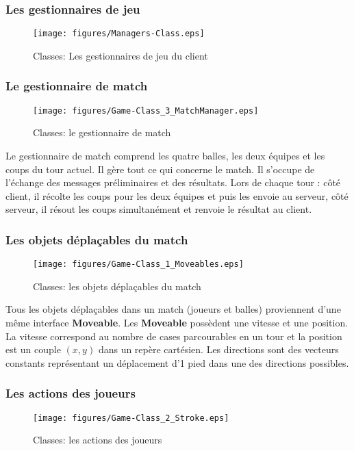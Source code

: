 \subsubsection{Les gestionnaires de jeu}
\begin{figure}[h!]
  \centering
  \texttt{[image: figures/Managers-Class.eps]}
  \caption{\label{fig:Class:Managers} Classes: Les gestionnaires de jeu du client}
\end{figure}


\subsubsection{Le gestionnaire de match}
\begin{figure}[h!]
  \centering
  \texttt{[image: figures/Game-Class\_3\_MatchManager.eps]}
  \caption{\label{fig:Class:MatchManager} Classes: le gestionnaire de match}
\end{figure}

Le gestionnaire de match comprend les quatre balles, les deux équipes et les coups du 
tour actuel. Il gère tout ce qui concerne le match. Il s'occupe de l'échange 
des messages préliminaires et des résultats. Lors de chaque tour : côté 
client, il récolte les coups pour les deux équipes et puis les envoie au 
\gls{serveur}, côté serveur, il résout les coups simultanément et renvoie le résultat 
au \gls{client}.

\subsubsection{Les objets déplaçables du match}
\begin{figure}[h!]
  \centering
  \texttt{[image: figures/Game-Class\_1\_Moveables.eps]}
  \caption{\label{fig:Class:GameMoveables} Classes: les objets déplaçables du match}
\end{figure}

Tous les objets déplaçables dans un match (joueurs et balles) proviennent d'une 
même interface \textbf{Moveable}. Les \textbf{Moveable} possèdent une vitesse 
et une position. La vitesse correspond au nombre de cases parcourables en un tour 
et la position est un couple $(x,y)$ dans un repère cartésien. Les directions sont des vecteurs constants représentant un déplacement d'1 pied dans une des directions possibles.

\subsubsection{Les actions des joueurs}
\begin{figure}[h!]
  \centering
  \texttt{[image: figures/Game-Class\_2\_Stroke.eps]}
  \caption{\label{fig:Class:Stroke} Classes: les actions des joueurs}
\end{figure}

